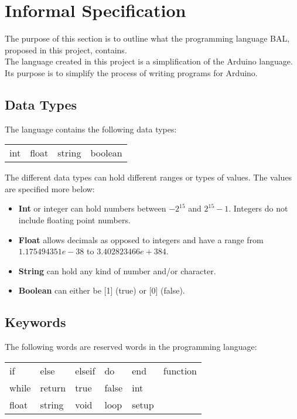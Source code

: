 \section{Informal Specification}\label{analysis:informal-specification}
The purpose of this section is to outline what the programming language BAL, proposed in this project, contains.
\\The language created in this project is a simplification of the Arduino language. Its purpose is to simplify the process of writing programs for Arduino.   

\subsection{Data Types}
The language contains the following data types: \\ 
\begin{center}
\begin{tabular}{ l l l l}
int & float & string & boolean \\
\end{tabular}
\end{center}

The different data types can hold different ranges or types of values. The values are specified more below: 
\begin{itemize}
\item \textbf{Int} or integer can hold numbers between $-2^{15}$ and $2^{15}-1$. Integers do not include floating point numbers.
\item \textbf{Float} allows decimals as opposed to integers and have a range from $1.175494351e-38$ to $3.402823466e+384$.
\item \textbf{String} can hold any kind of number and/or character. 
\item \textbf{Boolean} can either be [1] (true) or [0] (false). 
\end{itemize}

\subsection{Keywords}
The following words are reserved words in the programming language:\\ 
\begin{center}
\begin{tabular}{ l l l l l l}
if & else & elseif & do & end & function \\
while & return & true & false & int \\
float & string & void & loop & setup \\
\end{tabular}
\end{center}


